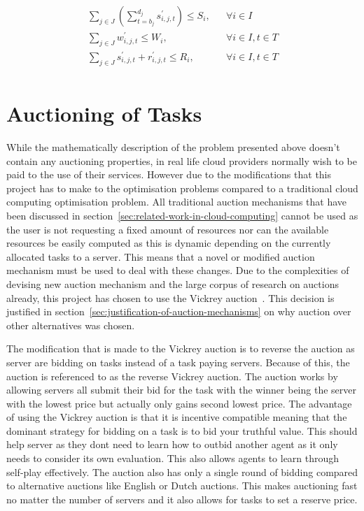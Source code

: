 \begin{align}
    \sum_{j \in J} \left(\sum^{d_j}_{t=b_j} s^{'}_{i,j,t} \right) \leq S_i, && \forall{i \in I} \label{eq:server_storage_capacity} \\
    \sum_{j \in J} w^{'}_{i,j,t} \leq W_i, && \forall{i \in I, t \in T} \label{eq:server_computation_capacity} \\
    \sum_{j \in J} s^{'}_{i,j,t} + r^{'}_{i,j,t} \leq R_i, && \forall{i \in I, t \in T} \label{eq:server_bandwidth_capacity} \\
\end{align}

\section{Auctioning of Tasks}\label{sec:auctioning-of-tasks}
While the mathematically description of the problem presented above doesn't contain any auctioning properties, in real
life cloud providers normally wish to be paid to the use of their services. However due to the modifications that
this project has to make to the optimisation problems compared to a traditional cloud computing optimisation problem.
All traditional auction mechanisms that have been discussed in section~\ref{sec:related-work-in-cloud-computing} cannot
be used as the user is not requesting a fixed amount of resources nor can the available resources be easily computed
as this is dynamic depending on the currently allocated tasks to a server. This means that a novel or modified auction
mechanism must be used to deal with these changes. Due to the complexities of devising new auction mechanism and the
large corpus of research on auctions already, this project has chosen to use the Vickrey auction~\citep{vickrey}.
This decision is justified in section~\ref{sec:justification-of-auction-mechanisms} on why auction over other
alternatives was chosen.

The modification that is made to the Vickrey auction is to reverse the auction as server are bidding on tasks instead of
a task paying servers. Because of this, the auction is referenced to as the reverse Vickrey auction. The auction works
by allowing servers all submit their bid for the task with the winner being the server with the lowest
price but actually only gains second lowest price. The advantage of using the Vickrey auction is that it is  incentive
compatible meaning that the dominant strategy for bidding on a task is to bid your truthful value. This should help
server as they dont need to learn how to outbid another agent as it only needs to consider its own evaluation.
This also allows agents to learn through self-play effectively. The auction also has only a single round of bidding
compared to alternative auctions like English or Dutch auctions. This makes auctioning fast no matter the number of
servers and it also allows for tasks to set a reserve price.

